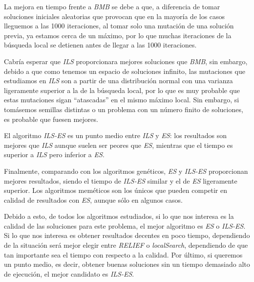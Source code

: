 \documentclass[11pt,a4paper]{article}
\begin{document}
La mejora en tiempo frente a \emph{BMB} se debe a que, a diferencia de tomar soluciones iniciales aleatorias que provocan que en la mayoría de los casos lleguemos a las 1000 iteraciones, al tomar solo una mutación de una solución previa, ya estamos cerca de un máximo, por lo que muchas iteraciones de la búsqueda local se detienen antes de llegar a las 1000 iteraciones.

Cabría esperar que \emph{ILS} proporcionara mejores soluciones que \emph{BMB}, sin embargo, debido a que como tenemos un espacio de soluciones infinito, las mutaciones que estudiamos en \emph{ILS} son a partir de una distribución normal con una varianza ligeramente superior a la de la búsqueda local, por lo que es muy probable que estas mutaciones sigan ``atascadas'' en el mismo máximo local. Sin embargo, si tomásemos semillas distintas o un problema con un número finito de soluciones, es probable que fuesen mejores.

El algoritmo \emph{ILS-ES} es un punto medio entre \emph{ILS} y \emph{ES}: los resultados son mejores que \emph{ILS} aunque suelen ser peores que \emph{ES}, mientras que el tiempo es superior a \emph{ILS} pero inferior a \emph{ES}.

Finalmente, comparando con los algoritmos genéticos, \emph{ES} y  \emph{ILS-ES} proporcionan mejores resultados, siendo el tiempo de \emph{ILS-ES} similar y el de \emph{ES} ligeramente superior. Los algoritmos meméticos son los únicos que pueden competir en calidad de resultados con \emph{ES}, aunque sólo en algunos casos.

Debido a esto, de todos los algoritmos estudiados, si lo que nos interesa es la calidad de las soluciones para este problema, el mejor algoritmo es \emph{ES} o \emph{ILS-ES}. Si lo que nos interesa es obtener resultados decentes en poco tiempo, dependiendo de la situación será mejor elegir entre \emph{RELIEF} o \emph{localSearch}, dependiendo de que tan importante sea el tiempo con respecto a la calidad. Por último, si queremos un punto medio, es decir, obtener buenas soluciones sin un tiempo demasiado alto de ejecución, el mejor candidato es \emph{ILS-ES}.
\end{document}

